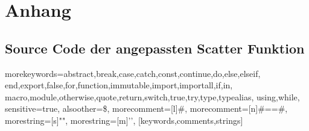\chapter{Anhang}

\section{Source Code der angepassten Scatter Funktion}

%
  {morekeywords={abstract,break,case,catch,const,continue,do,else,elseif,%
      end,export,false,for,function,immutable,import,importall,if,in,%
      macro,module,otherwise,quote,return,switch,true,try,type,typealias,%
      using,while},%
   sensitive=true,%
   alsoother={\$},%
   morecomment=[l]#,%
   morecomment=[n]{#=}{=#},%
   morestring=[s]{"}{"},%
   morestring=[m]{'}{'},%
}[keywords,comments,strings]%

